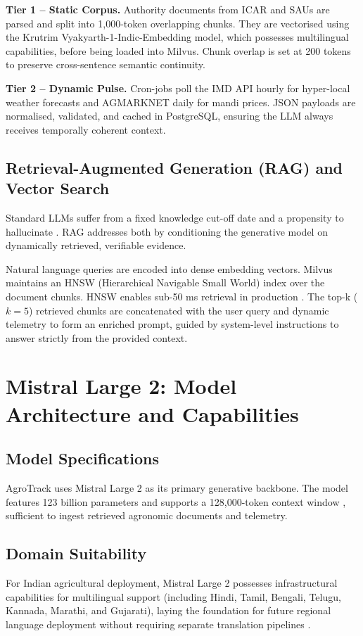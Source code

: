 \documentclass[10pt,twocolumn,letterpaper]{article}
\begin{document}
\textbf{Tier 1 -- Static Corpus.} Authority documents from ICAR and SAUs are parsed and split into 1,000-token overlapping chunks. They are vectorised using the Krutrim Vyakyarth-1-Indic-Embedding model, which possesses multilingual capabilities, before being loaded into Milvus. Chunk overlap is set at 200 tokens to preserve cross-sentence semantic continuity.

\textbf{Tier 2 -- Dynamic Pulse.} Cron-jobs poll the IMD API hourly for hyper-local weather forecasts and AGMARKNET daily for mandi prices. JSON payloads are normalised, validated, and cached in PostgreSQL, ensuring the LLM always receives temporally coherent context.

\subsection{Retrieval-Augmented Generation (RAG) and Vector Search}
Standard LLMs suffer from a fixed knowledge cut-off date and a propensity to hallucinate \cite{Lewis_2020}. RAG addresses both by conditioning the generative model on dynamically retrieved, verifiable evidence.

Natural language queries are encoded into dense embedding vectors. Milvus maintains an HNSW (Hierarchical Navigable Small World) index over the document chunks. HNSW enables sub-50 ms retrieval in production \cite{Malkov_2018}. The top-k ($k=5$) retrieved chunks are concatenated with the user query and dynamic telemetry to form an enriched prompt, guided by system-level instructions to answer strictly from the provided context.

\section{Mistral Large 2: Model Architecture and Capabilities}
\subsection{Model Specifications}
AgroTrack uses Mistral Large 2 as its primary generative backbone. The model features 123 billion parameters and supports a 128,000-token context window \cite{Mistral_2024}, sufficient to ingest retrieved agronomic documents and telemetry.

\subsection{Domain Suitability}
For Indian agricultural deployment, Mistral Large 2 possesses infrastructural capabilities for multilingual support (including Hindi, Tamil, Bengali, Telugu, Kannada, Marathi, and Gujarati), laying the foundation for future regional language deployment without requiring separate translation pipelines \cite{Mistral_2024}.
\end{document}
